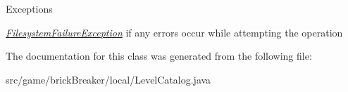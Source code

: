\begin{DoxyExceptions}{Exceptions}
\item[{\em \hyperlink{classbrick_breaker_1_1local_1_1_filesystem_failure_exception}{FilesystemFailureException}}]if any errors occur while attempting the operation \end{DoxyExceptions}


The documentation for this class was generated from the following file:\begin{DoxyCompactItemize}
\item 
src/game/brickBreaker/local/LevelCatalog.java\end{DoxyCompactItemize}
